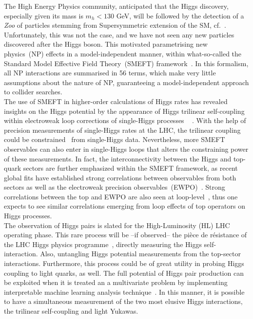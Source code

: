  The High Energy Physics community, anticipated that the Higgs discovery, especially given its mass is $ m_h <130$ GeV, will be followed by the detection of a \emph{Zoo} of particles stemming from Supersymmetric extension of the SM, cf.~\cite{handle:20.500.11811/5384}. Unfortunately, this was not the case, and we have not seen any new particles discovered after the Higgs boson. This motivated parametrising new physics~(NP) effects in a model-independent manner,  within what-so-called the Standard Model Effective Field Theory~(SMEFT) framework~\cite{Grzadkowski:2010es,Alonso:2013hga}. In this formalism, all NP interactions are summarised in 56 terms, which make very little assumptions about  the nature of NP, guaranteeing a model-independent approach to collider searches. \\ 
 The use of SMEFT in higher-order calculations of Higgs rates has revealed insights on the Higgs potential by the appearance of Higgs trilinear self-coupling within electroweak loop corrections of single-Higgs processes ~\cite{DiVita:2017vrr} . With the help of precision measurements of single-Higgs rates at the LHC, the trilinear coupling could be constrained~\cite{DiMicco:2019ngk} from single-Higgs data. Nevertheless, more SMEFT observables can also enter in single-Higgs loops that alters the constraining power of these measurements. In fact, the interconnectivity between the Higgs and top-quark sectors are further emphasized within the SMEFT framework, as recent global fits have established strong correlations between observables from both sectors as well as the electroweak precision observables~(EWPO)~\cite{Ellis:2020unq}. Strong correlations between the top and EWPO are also seen at loop-level~\cite{Dawson:2020oco}, thus one expects to see similar correlations emerging from loop effects of top operators on Higgs processes. \\
 The observation of Higgs pairs is slated for the High-Luminosity (HL) LHC operating phase. This rare process will be --if observed-- the pi\`ece de r\'esistance of the LHC Higgs physics programme~\cite{Bernius:2666331}, directly measuring the Higgs self-interaction. Also, untangling Higgs potential measurements  from the top-sector interactions. Furthermore,  this process could be of great utility in probing Higgs coupling to light quarks, as well. The full potential of Higgs pair production can be exploited when it is treated an a multivariate problem by implementing interpretable machine learning analysis technique~\cite{Grojean:2020ech}. In this manner, it is possible to have a simultaneous measurement of the two most elusive Higgs interactions, the trilinear self-coupling and light Yukawas.\\
